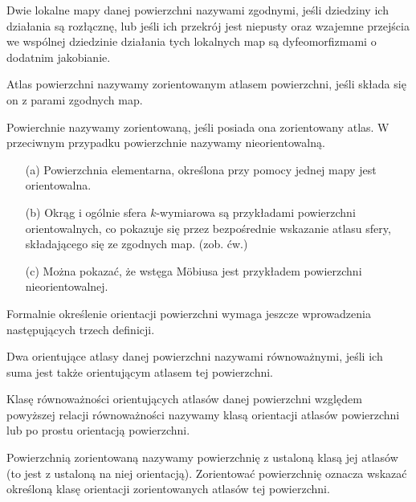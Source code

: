\documentclass[leqno]{article}
\begin{document}
\begin{justify}
\begin{defn}
    Dwie lokalne mapy danej powierzchni nazywami zgodnymi, jeśli dziedziny ich działania są rozłącznę, lub jeśli ich przekrój jest niepusty oraz wzajemne przejścia we wspólnej dziedzinie 
    działania tych lokalnych map są dyfeomorfizmami o dodatnim jakobianie.
\end{defn}

\begin{defn}
    Atlas powierzchni nazywamy zorientowanym atlasem powierzchni, jeśli składa się on z parami zgodnych map.
\end{defn}

\begin{defn}
    Powierchnie nazywamy zorientowaną, jeśli posiada ona zorientowany atlas. W przeciwnym przypadku powierzchnie nazywamy nieorientowalną.
\end{defn}

\begin{ex}
    \begin{itemize}
        \item [(a)]
            Powierzchnia elementarna, określona przy pomocy jednej mapy jest orientowalna.
        \item [(b)]
            Okrąg i ogólnie sfera $k$-wymiarowa są przykładami powierzchni orientowalnych, co pokazuje się przez bezpośrednie wskazanie atlasu sfery, składającego się ze zgodnych map. (zob. ćw.)
        \item [(c)] Można pokazać, że wstęga Möbiusa jest przykładem powierzchni nieorientowalnej.
    \end{itemize}
\end{ex}

Formalnie określenie orientacji powierzchni wymaga jeszcze wprowadzenia następujących trzech definicji.

\begin{defn}
    Dwa orientujące atlasy danej powierzchni nazywami równoważnymi, jeśli ich suma jest także orientującym atlasem tej powierzchni.
\end{defn}

\begin{defn}
    Klasę równoważności orientujących atlasów danej powierzchni względem powyższej relacji równoważności nazywamy klasą orientacji atlasów powierzchni lub po prostu 
    orientacją powierzchni.
\end{defn}

\begin{defn}
    Powierzchnią zorientowaną nazywamy powierzchnię z ustaloną klasą jej atlasów (to jest z ustaloną na niej orientacją).
    Zorientować powierzchnię oznacza wskazać określoną klasę orientacji zorientowanych atlasów tej powierzchni.
\end{defn}


\end{justify}
\end{document}
